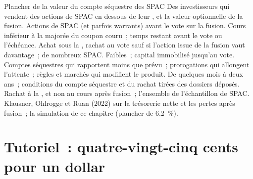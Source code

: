\begin{strategyfile}{Plancher de la valeur du compte séquestre des SPAC}\label{strat:s1:share-classes-holding-companies-closed-end-funds-spacs:spac}
 Des investisseurs qui vendent des actions de SPAC en dessous de leur , et la valeur optionnelle de la fusion.
 Actions de SPAC (et parfois warrants) avant le vote sur la fusion.
 Cours inférieur à la  majorée du coupon couru~; temps restant avant le vote ou l'échéance.
 Achat sous la , rachat au vote sauf si l'action issue de la fusion vaut davantage~; de nombreux SPAC.
 Faibles~; capital immobilisé jusqu'au vote.
 Comptes séquestres qui rapportent moins que prévu~; prorogations qui allongent l'attente~; règles et marchés qui modifient le produit.
 De quelques mois à deux ans~; conditions du compte séquestre et du rachat tirées des dossiers déposés.
 Rachat à la , et non au cours après fusion~; l'ensemble de l'échantillon de SPAC.
 Klausner, Ohlrogge et Ruan (2022) sur la trésorerie nette et les pertes après fusion~; la simulation de ce chapitre (plancher de 6.2~\%).
\end{strategyfile}

\section{Tutoriel~: quatre-vingt-cinq cents pour un dollar}\label{tut:s1:share-classes-holding-companies-closed-end-funds-spacs:tut}

